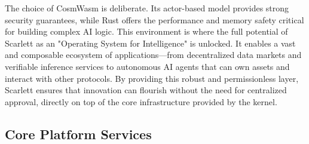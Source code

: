 \documentclass[10pt]{article}
\begin{document}
The choice of CosmWasm is deliberate. Its actor-based model provides strong security guarantees, while Rust offers the performance and memory safety critical for building complex AI logic. This environment is where the full potential of Scarlett as an "Operating System for Intelligence" is unlocked. It enables a vast and composable ecosystem of applications---from decentralized data markets and verifiable inference services to autonomous AI agents that can own assets and interact with other protocols. By providing this robust and permissionless layer, Scarlett ensures that innovation can flourish without the need for centralized approval, directly on top of the core infrastructure provided by the kernel.

\subsection{Core Platform Services}
\end{document}
